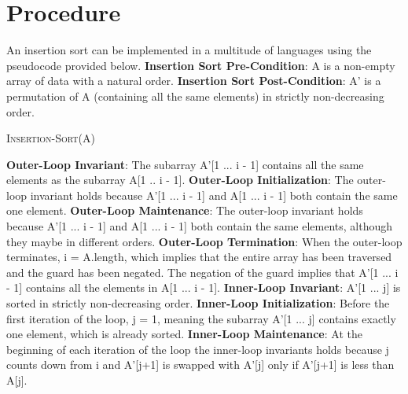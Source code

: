 \documentclass[onecolumn, 12pt, article]{IEEEtran}
\numberwithin{case}{problem}
\numberwithin{condition}{problem}
\numberwithin{condition}{subsection}
\numberwithin{definition}{section}
\theoremstyle{remark}
\numberwithin{question}{problem}
\theoremstyle{plain}
\numberwithin{answer}{problem}
\numberwithin{solution}{section}
\numberwithin{equation}{section}%
\begin{document}
\section{Procedure}
An insertion sort can be implemented in a multitude of languages using the pseudocode provided below.
\newline
\textbf{Insertion Sort Pre-Condition}: A is a non-empty array of data with a natural order.
\newline
\textbf{Insertion Sort Post-Condition}: A' is a permutation of A (containing all the same elements) in strictly non-decreasing order.
\begin{algorithm}
\caption {\textsc{Insertion-Sort}(A)}
\label{algo:insertionsort}
\begin{algorithmic}[1]
	\EndWhile
\EndWhile
\EndProcedure
\end{algorithmic}
\end{algorithm}
\newline
\textbf{Outer-Loop Invariant}: The subarray A'[1 ... i - 1] contains all the same elements as the subarray A[1 .. i - 1].
\newline 
\textbf{Outer-Loop Initialization}: The outer-loop invariant holds because A'[1 ... i - 1] and A[1 ... i - 1] both contain the same one element.
\newline
\textbf{Outer-Loop Maintenance}: The outer-loop invariant holds because A'[1 ... i - 1] and A[1 ... i - 1] both contain the same elements, although they maybe in different orders.
\newline
\textbf{Outer-Loop Termination}: When the outer-loop terminates, i = A.length, which implies that the entire array has been traversed and the guard has been negated. The negation of the guard implies that A'[1 ... i - 1] contains all the elements in A[1 ... i - 1].
\newline
\newline
\textbf{Inner-Loop Invariant}: A'[1 ... j] is sorted in strictly non-decreasing order.
\newline
\textbf{Inner-Loop Initialization}: Before the first iteration of the loop, j = 1, meaning the subarray A'[1 ... j] contains exactly one element, which is already sorted.
\newline
\textbf{Inner-Loop Maintenance}: At the beginning of each iteration of the loop the inner-loop invariants holds because j counts down from i and A'[j+1] is swapped with A'[j] only if A'[j+1] is less than A[j].
\end{document}

